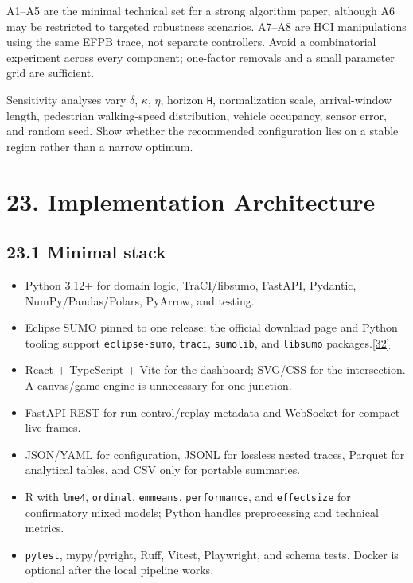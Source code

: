 \documentclass[
  english,
  11pt,
  a4paper,
]{article}
\providecommand{\tightlist}{%
  \setlength{\itemsep}{0pt}\setlength{\parskip}{0pt}}
\begin{document}
A1--A5 are the minimal technical set for a strong algorithm paper,
although A6 may be restricted to targeted robustness scenarios. A7--A8
are HCI manipulations using the same EFPB trace, not separate
controllers. Avoid a combinatorial experiment across every component;
one-factor removals and a small parameter grid are sufficient.

Sensitivity analyses vary \(\delta\), \(\kappa\), \(\eta\), horizon \texttt{H},
normalization scale, arrival-window length, pedestrian walking-speed
distribution, vehicle occupancy, sensor error, and random seed. Show
whether the recommended configuration lies on a stable region rather
than a narrow optimum.

\section{23. Implementation
Architecture}\label{implementation-architecture}

\subsection{23.1 Minimal stack}\label{minimal-stack}

\begin{itemize}
\tightlist
\item
  Python 3.12+ for domain logic, TraCI/libsumo, FastAPI, Pydantic,
  NumPy/Pandas/Polars, PyArrow, and testing.
\item
  Eclipse SUMO pinned to one release; the official download page and
  Python tooling support \texttt{eclipse-sumo}, \texttt{traci},
  \texttt{sumolib}, and \texttt{libsumo}
  packages.\hyperref[source-32]{[32]}
\item
  React + TypeScript + Vite for the dashboard; SVG/CSS for the
  intersection. A canvas/game engine is unnecessary for one junction.
\item
  FastAPI REST for run control/replay metadata and WebSocket for compact
  live frames.
\item
  JSON/YAML for configuration, JSONL for lossless nested traces, Parquet
  for analytical tables, and CSV only for portable summaries.
\item
  R with \texttt{lme4}, \texttt{ordinal}, \texttt{emmeans},
  \texttt{performance}, and \texttt{effectsize} for confirmatory mixed
  models; Python handles preprocessing and technical metrics.
\item
  \texttt{pytest}, mypy/pyright, Ruff, Vitest, Playwright, and schema
  tests. Docker is optional after the local pipeline works.
\end{itemize}
\end{document}

